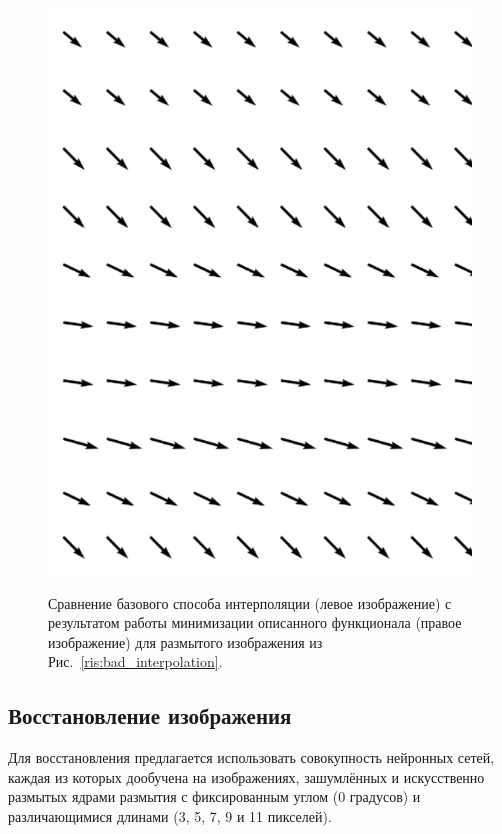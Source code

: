 \begin{figure} [H]
\begin{minipage}[w]{0.28\linewidth}
\includegraphics[width=1\linewidth, left]{pics/fields/method.png} \\ 
\end{minipage}
\caption{Сравнение базового способа интерполяции (левое изображение) с результатом работы минимизации описанного функционала (правое изображение) для размытого изображения из Рис.~\ref{ris:bad_interpolation}.}
\label{ris:good_interpolation}
\end{figure}


\newpage
\subsection{Восстановление изображения}
Для восстановления предлагается использовать совокупность нейронных сетей, каждая из которых дообучена на изображениях, зашумлённых и искусственно размытых ядрами размытия с фиксированным углом (0 градусов)
и различающимися длинами (3, 5, 7, 9 и 11 пикселей).

